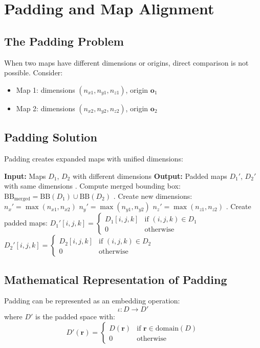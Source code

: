 \documentclass[12pt,a4paper]{article}
\begin{document}
\section{Padding and Map Alignment}

\subsection{The Padding Problem}
When two maps have different dimensions or origins, direct comparison is not possible. Consider:
\begin{itemize}
    \item Map 1: dimensions $(n_{x1}, n_{y1}, n_{z1})$, origin $\mathbf{o}_1$
    \item Map 2: dimensions $(n_{x2}, n_{y2}, n_{z2})$, origin $\mathbf{o}_2$
\end{itemize}

\subsection{Padding Solution}
Padding creates expanded maps with unified dimensions:

\begin{algorithm}
\caption{Map Padding Algorithm}
\begin{algorithmic}
\STATE \textbf{Input:} Maps $D_1$, $D_2$ with different dimensions
\STATE \textbf{Output:} Padded maps $D_1'$, $D_2'$ with same dimensions
\STATE
{}. Compute merged bounding box:
\STATE \quad $\text{BB}_{\text{merged}} = \text{BB}(D_1) \cup \text{BB}(D_2)$
\STATE
{}. Create new dimensions:
\STATE \quad $n_x' = \max(n_{x1}, n_{x2})$
\STATE \quad $n_y' = \max(n_{y1}, n_{y2})$
\STATE \quad $n_z' = \max(n_{z1}, n_{z2})$
\STATE
{}. Create padded maps:
\STATE \quad $D_1'[i,j,k] = \begin{cases} D_1[i,j,k] & \text{if } (i,j,k) \in D_1 \\ 0 & \text{otherwise} \end{cases}$
\STATE \quad $D_2'[i,j,k] = \begin{cases} D_2[i,j,k] & \text{if } (i,j,k) \in D_2 \\ 0 & \text{otherwise} \end{cases}$
\end{algorithmic}
\end{algorithm}

\subsection{Mathematical Representation of Padding}
Padding can be represented as an embedding operation:
\begin{equation}
\iota: D \rightarrow D'
\end{equation}
where $D'$ is the padded space with:
\begin{equation}
D'(\mathbf{r}) = \begin{cases}
D(\mathbf{r}) & \text{if } \mathbf{r} \in \text{domain}(D) \\
0 & \text{otherwise}
\end{cases}
\end{equation}
\end{document}

